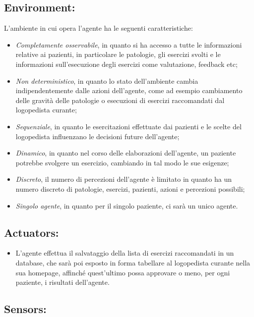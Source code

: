 \documentclass{article}
\begin{document}
    \subsection{Environment:}

    L’ambiente in cui opera l'agente ha le seguenti caratteristiche:

    \begin{itemize}
        \item \textit{Completamente osservabile}, in quanto si ha accesso a tutte le informazioni relative ai pazienti, in particolare le patologie, gli esercizi svolti e le informazioni sull'esecuzione degli esercizi come valutazione, feedback etc;
        \item \textit{Non deterministico}, in quanto lo stato dell’ambiente cambia indipendentemente dalle azioni dell’agente, come ad esempio cambiamento delle gravità delle patologie o esecuzioni di esercizi raccomandati dal logopedista curante;
        \item \textit{Sequenziale}, in quanto le esercitazioni effettuate dai pazienti e le scelte del logopedista influenzano le decisioni future dell’agente;
        \item \textit{Dinamico}, in quanto nel corso delle elaborazioni dell’agente, un paziente potrebbe svolgere un esercizio, cambiando in tal modo le sue esigenze;
        \item \textit{Discreto}, il numero di percezioni dell’agente è limitato in quanto ha un numero discreto di patologie, esercizi, pazienti, azioni e percezioni possibili;
        \item \textit{Singolo agente}, in quanto per il singolo paziente, ci sarà un unico agente.
    \end{itemize}

    \subsection{Actuators:}

    \begin{itemize}
        \item L'agente effettua il salvataggio della lista di esercizi raccomandati in un database, che sarà poi esposto in forma tabellare  al logopedista curante nella sua homepage, affinché quest'ultimo possa approvare o meno, per ogni paziente, i risultati dell'agente.
    \end{itemize}

    \subsection{Sensors:}
\end{document}
